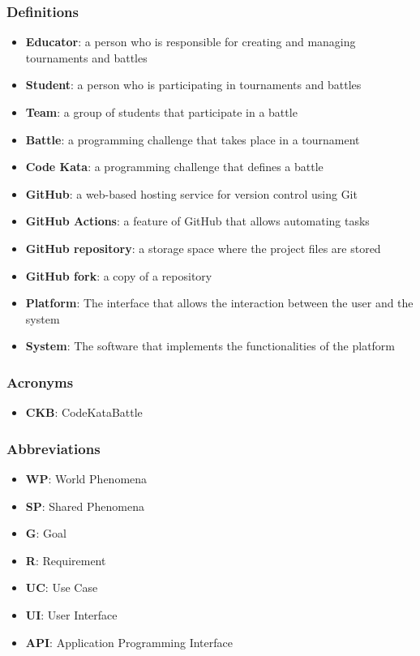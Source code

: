 \subsubsection{Definitions}
\begin{itemize}
    \item \textbf{Educator}: a person who is responsible for creating and managing tournaments and battles
    \item \textbf{Student}: a person who is participating in tournaments and battles
    \item \textbf{Team}: a group of students that participate in a battle
    \item \textbf{Battle}: a programming challenge that takes place in a tournament
    \item \textbf{Code Kata}: a programming challenge that defines a battle
    \item \textbf{GitHub}: a web-based hosting service for version control using Git
    \item \textbf{GitHub Actions}: a feature of GitHub that allows automating tasks
    \item \textbf{GitHub repository}: a storage space where the project files are stored
    \item \textbf{GitHub fork}: a copy of a repository
    \item \textbf{Platform}: The interface that allows the interaction between the user and the system
    \item \textbf{System}: The software that implements the functionalities of the platform
\end{itemize}
\subsubsection{Acronyms}
\begin{itemize}
    \item \textbf{CKB}: CodeKataBattle
\end{itemize}
\subsubsection{Abbreviations}
\begin{itemize}
    \item \textbf{WP}: World Phenomena
    \item \textbf{SP}: Shared Phenomena
    \item \textbf{G}: Goal
    \item \textbf{R}: Requirement
    \item \textbf{UC}: Use Case
    \item \textbf{UI}: User Interface
    \item \textbf{API}: Application Programming Interface
\end{itemize}
